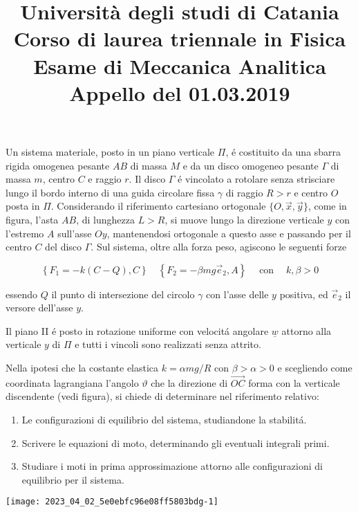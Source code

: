 \documentclass[10pt]{article}
\title{Università degli studi di Catania 
 Corso di laurea triennale in Fisica 
 Esame di Meccanica Analitica Appello del 01.03.2019 }
\author{}
\date{}
\begin{document}
\maketitle
Un sistema materiale, posto in un piano verticale \(\Pi\), é costituito da una sbarra rigida omogenea pesante \(A B\) di massa \(M\) e da un disco omogeneo pesante \(\Gamma\) di massa \(m\), centro \(C\) e raggio \(r\). Il disco \(\Gamma\) é vincolato a rotolare senza strisciare lungo il bordo interno di una guida circolare fissa \(\gamma\) di raggio \(R>r\) e centro \(O\) posta in \(\Pi\). Considerando il riferimento cartesiano ortogonale \(\{O, \vec{x}, \vec{y}\}\), come in figura, l'asta \(A B\), di lunghezza \(L>R\), si muove lungo la direzione verticale \(y\) con l'estremo \(A\) sull'asse \(O y\), mantenendosi ortogonale a questo asse e passando per il centro \(C\) del disco \(\Gamma\). Sul sistema, oltre alla forza peso, agiscono le seguenti forze

\[
\left\{F_{1}=-k(C-Q), C\right\} \quad\left\{F_{2}=-\beta m g \vec{e}_{2}, A\right\} \quad \operatorname{con} \quad k, \beta>0
\]

essendo \(Q\) il punto di intersezione del circolo \(\gamma\) con l'asse delle \(y\) positiva, ed \(\vec{e}_{2}\) il versore dell'asse \(y\).

Il piano II é posto in rotazione uniforme con velocitá angolare \(\underline{w}\) attorno alla verticale \(y\) di \(\Pi\) e tutti i vincoli sono realizzati senza attrito.

Nella ipotesi che la costante elastica \(k=\alpha m g / R\) con \(\beta>\alpha>0\) e scegliendo come coordinata lagrangiana l'angolo \(\vartheta\) che la direzione di \(\overrightarrow{O C}\) forma con la verticale discendente (vedi figura), si chiede di determinare nel riferimento relativo:

\begin{enumerate}
  \item Le configurazioni di equilibrio del sistema, studiandone la stabilitá.

  \item Scrivere le equazioni di moto, determinando gli eventuali integrali primi.

  \item Studiare i moti in prima approssimazione attorno alle configurazioni di equilibrio per il sistema.

\end{enumerate}

\begin{center}
\texttt{[image: 2023\_04\_02\_5e0ebfc96e08ff5803bdg-1]}
\end{center}
\end{document}
